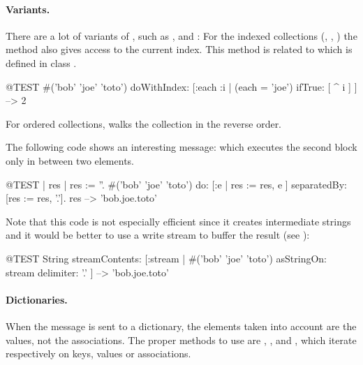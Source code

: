 \documentclass[a4paper,10pt,twoside]{book}
\begin{document}
\paragraph{Variants.} There are a lot of variants of , such as \mbox{,} \mbox{} and :
For the indexed collections (, , ) the method  also gives access to the current index. This method is related to  which is defined in class .

\begin{code}{@TEST}
#('bob' 'joe' 'toto') doWithIndex: [:each :i | (each = 'joe') ifTrue: [ ^ i ] ] --> 2
\end{code}

For ordered collections,  walks the collection in the reverse order. 

The following code shows an interesting message:  which 
executes the second block only in between two elements.
\begin{code}{@TEST | res | }
res := ''.
#('bob' 'joe' 'toto') do: [:e | res := res, e ] separatedBy: [res := res, '.'].
res --> 'bob.joe.toto'
\end{code}
\noindent
Note that this code is not especially efficient since it creates intermediate strings and it would be better to use a write stream to buffer the result (see ):
\begin{code}{@TEST}
String streamContents: [:stream | #('bob' 'joe' 'toto') asStringOn: stream delimiter: '.' ] --> 'bob.joe.toto'
\end{code}



\paragraph{Dictionaries.}
When the message  is sent to a dictionary, the elements taken into account are the values, not the associations. The proper methods to use are , , and , which iterate respectively on keys, values or associations.
\end{document}
